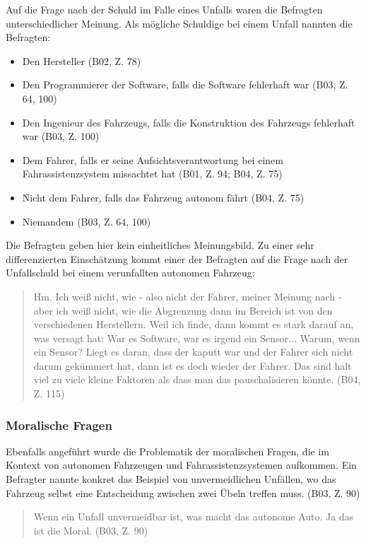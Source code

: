 \documentclass[12pt]{article}
\begin{document}
Auf die Frage nach der Schuld im Falle eines Unfalls waren die Befragten unterschiedlicher Meinung. Als mögliche Schuldige bei einem Unfall nannten die Befragten:
\begin{itemize}
    \item Den Hersteller (B02, Z. 78)
    \item Den Programmierer der Software, falls die Software fehlerhaft war (B03, Z. 64, 100)
    \item Den Ingenieur des Fahrzeugs, falls die Konstruktion des Fahrzeugs fehlerhaft war (B03, Z. 100)
    \item Dem Fahrer, falls er seine Aufsichtsverantwortung bei einem Fahrassistenzsystem missachtet hat (B01, Z. 94; B04, Z. 75)
    \item Nicht dem Fahrer, falls das Fahrzeug autonom fährt (B04, Z. 75)
    \item Niemandem (B03, Z. 64, 100)
\end{itemize}

Die Befragten geben hier kein einheitliches Meinungsbild. Zu einer sehr differenzierten Einschätzung kommt einer der Befragten auf die Frage nach der Unfallschuld bei einem verunfallten autonomen Fahrzeug:
\begin{quote}
    Hm. Ich weiß nicht, wie - also nicht der Fahrer, meiner Meinung nach - aber ich weiß nicht, wie die Abgrenzung dann im Bereich ist von den verschiedenen Herstellern. Weil ich finde, dann kommt es stark darauf an, was versagt hat: War es Software, war es irgend ein Sensor... Warum, wenn ein Sensor? Liegt es daran, dass der kaputt war und der Fahrer sich nicht darum gekümmert hat, dann ist es doch wieder der Fahrer. Das sind halt viel zu viele kleine Faktoren als dass man das pauschalisieren könnte. (B04, Z. 115)
\end{quote}

\subsubsection*{Moralische Fragen}
Ebenfalls angeführt wurde die Problematik der moralischen Fragen, die im Kontext von autonomen Fahrzeugen und Fahrassistenzsystemen aufkommen. Ein Befragter nannte konkret das Beispiel von unvermeidlichen Unfällen, wo das Fahrzeug selbst eine Entscheidung zwischen zwei Übeln treffen muss. (B03, Z. 90)

\begin{quote}
    Wenn ein Unfall unvermeidbar ist, was macht das autonome Auto. Ja das ist die Moral. (B03, Z. 90)
\end{quote}
\end{document}
